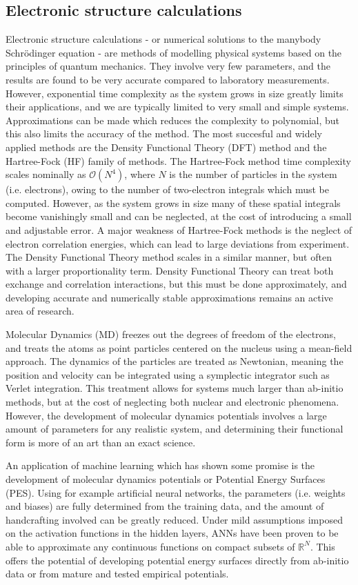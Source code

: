 \subsection{Electronic structure calculations}
Electronic structure calculations - or numerical solutions
to the manybody Schr\"{o}dinger equation - are methods of modelling
physical systems based on the principles of quantum mechanics.
They involve very few parameters, and the results are found
to be very accurate compared to laboratory measurements.
However, exponential time complexity as the system grows in size
greatly limits their applications,
and we are typically limited to very small and simple systems.
Approximations can be made which reduces the complexity 
to polynomial, but this also limits the accuracy of the method.
The most succesful and widely applied methods
are the Density Functional Theory (DFT) method
and the Hartree-Fock (HF) family of methods.
The Hartree-Fock method time complexity 
scales nominally as $\mathcal{O}(N^4)$,
where $N$ is the number of particles in the system
(i.e. electrons), owing to the number of two-electron
integrals which must be computed.
However, as the system grows in size many of these spatial integrals
become vanishingly small and can be neglected, at the cost of
introducing a small and adjustable error.
A major weakness of Hartree-Fock methods is the neglect
of electron correlation energies, which can lead to
large deviations from experiment.
The Density Functional Theory method scales in a similar
manner, but often with a larger proportionality term.
Density Functional Theory can treat both exchange and correlation
interactions, but this must be done approximately,
and developing accurate and numerically stable approximations
remains an active area of research\cite{gillan2016perspective}.
\par
Molecular Dynamics (MD) freezes out the degrees of freedom of the
electrons, and treats the atoms as point particles centered on
the nucleus using a mean-field approach.
The dynamics of the particles are treated as Newtonian,
meaning the position and velocity can be integrated using a
symplectic integrator such as Verlet integration.
This treatment allows for systems much larger
than ab-initio methods, but at the cost of neglecting
both nuclear and electronic phenomena.
However, the development of molecular dynamics potentials
involves a large amount of parameters for any realistic system,
and determining their functional form is more of an
art than an exact science.
\par
An application of machine learning which has shown some promise
is the development of molecular dynamics potentials
or Potential Energy Surfaces (PES)\cite{behler2016perspective}.
Using for example
artificial neural networks, the parameters (i.e. weights and biases)
are fully determined from the training data, and the amount
of handcrafting involved can be greatly reduced.
Under mild assumptions imposed on the activation functions in the
hidden layers, ANNs have been proven to be able to approximate
any continuous functions on compact subsets of $\mathbb{R}^N$\cite{
    hornik1989multilayer}.
This offers the potential of developing potential energy surfaces
directly from ab-initio data or from mature and tested
empirical potentials.

